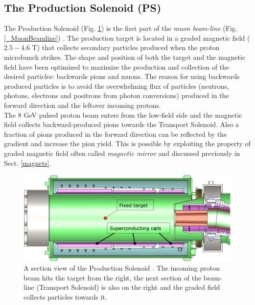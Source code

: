 \documentclass[12pt,a4paper,openright, oneside, titlepage]{book} %
\begin{document}
\subsection{The Production Solenoid (PS)}
The Production Solenoid (Fig. \ref{_PS}) is the first part of the \textit{muon beam-line} (Fig. \ref{_MuonBeamline}) \cite{PS}. 
The production target is located in a graded magnetic field ($2.5 - 4.6$ T) that collects secondary particles produced when the proton microbunch strikes. The shape and position of both the target and the magnetic field have been optimized to maximize the production and collection of the desired particles: backwards pions and muons. 
The reason for using backwards produced particles is to avoid the overwhelming flux of particles 
(neutrons, photons, electrons and positrons from photon conversions) 
produced in the forward direction and the leftover incoming protons.\\
The 8 GeV pulsed proton beam enters from the low-field side and the magnetic field collects backward-produced pions towards the Transport Solenoid. 
Also a fraction of pions produced in the forward direction can be reflected by the gradient and  increase the pion yield. 
This is possible by exploiting the property of graded magnetic field often called \textit{magnetic mirror} 
and discussed previously in Sect. \ref{magnets}.

\begin{figure}[h!]
\centering
\includegraphics[scale=0.4]{PS}
\caption[Production Solenoid]{A section view of the Production Solenoid \cite{PS}. 
The incoming proton beam hits the target from the right, 
the next section of the beam-line (Transport Solenoid) is also on the right and the graded field collects particles towards it.}
\label{_PS}
\end{figure}
\end{document}

